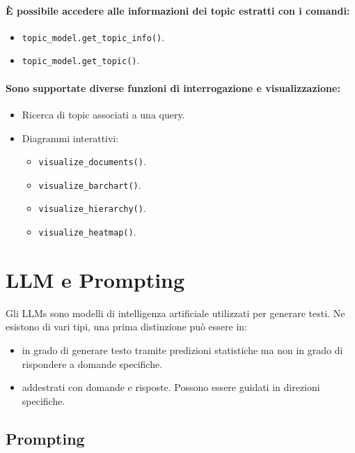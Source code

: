 \paragraph{È possibile accedere alle informazioni dei topic estratti con i comandi:}

\begin{itemize}
  \item \texttt{topic\_model.get\_topic\_info()}. 
  \item \texttt{topic\_model.get\_topic()}.
\end{itemize}

\paragraph{Sono supportate diverse funzioni di interrogazione e visualizzazione:}

\begin{itemize}
  \item Ricerca di topic associati a una query. 
  \item Diagrammi interattivi: 
    \begin{itemize}
      \item \texttt{visualize\_documents()}. 
      \item \texttt{visualize\_barchart()}. 
      \item \texttt{visualize\_hierarchy()}. 
      \item \texttt{visualize\_heatmap()}.
    \end{itemize}
\end{itemize}

\section{LLM e Prompting}

Gli LLMs sono modelli di intelligenza artificiale utilizzati per generare testi. Ne esistono di vari tipi, una prima distinzione può essere in:

\begin{itemize}
  \item {} in grado di generare testo tramite predizioni statistiche ma non in grado di rispondere a domande specifiche. 
  \item {} addestrati con domande e risposte. Possono essere guidati in direzioni specifiche.
\end{itemize}

\subsection{Prompting}

